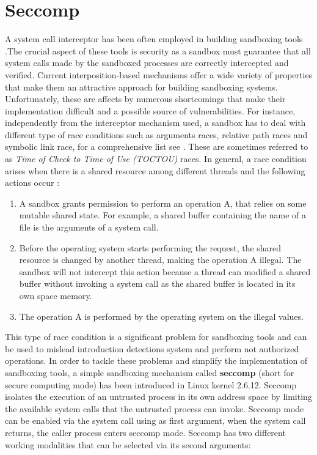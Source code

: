 \section{Seccomp}
\label{seccomp}
A system call interceptor has been often employed in building sandboxing tools \cite{Janus, Garfinkel03ostia:a,MapBox, others}.The crucial aspect of these tools is security as a sandbox must guarantee that all system calls made by the sandboxed processes are correctly intercepted and verified. Current interposition-based mechanisms offer a wide variety of properties that make them an attractive approach for building sandboxing systems. Unfortunately, these are affects by numerous shortcomings that make their implementation difficult and a possible source of vulnerabilities. For instance, independently from the interceptor mechanism used, a sandbox has to deal with different type of race conditions such as arguments races, relative path races and symbolic link race, for a comprehensive list see \cite{garfinkel:traps, Watson_exploitingconcurrency}. These are sometimes referred to as \textit{Time of Check to Time of Use (TOCTOU)} races. In general, a race condition arises when there is a shared resource among different threads and the following actions occur : 
\begin{enumerate}

\item A sandbox grants permission to perform an operation A, that relies on some mutable shared state. For example, a shared buffer containing the name of a file is the arguments of a system call. 

\item Before the operating system starts performing the request, the shared resource is changed by another thread, making the operation A illegal. The sandbox will not intercept this action because a thread can modified a shared buffer without invoking a system call as the shared buffer is located in its own space memory. 

\item The operation A is performed by the operating system on the illegal values. 
\end{enumerate}  

This type of race condition is a significant problem for sandboxing tools and can be used to mislead introduction detections system and perform not authorized operations. In order to tackle these problems and simplify the implementation of sandboxing tools, a simple sandboxing mechanism called \textbf{seccomp} (short for secure computing mode)  has been introduced in Linux kernel 2.6.12. Seccomp isolates the execution of an untrusted process in its own address space by limiting the available system calls that the untrusted process can invoke. Seccomp mode can be enabled via the  \cite{prctl}  system call using   as first argument, when the system call returns,  the caller process enters seccomp mode. Seccomp has two different working modalities that can be selected via its second arguments:  

